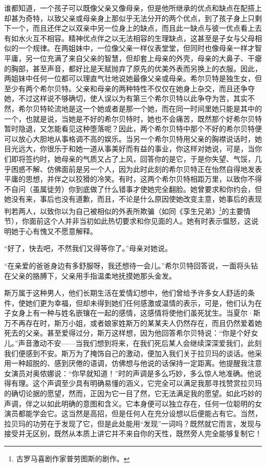 \par 谁都知道，一个孩子可以既像父亲又像母亲，但是他所继承的优点和缺点在配搭上却甚为奇特，以致父亲或母亲身上那似乎无法分开的两个优点，到了孩子身上只剩下一个，而且还伴之以双亲中另一位身上的缺点，而且此一缺点与彼一优点看上去有如水火互不相容。精神优点伴之以无法相容的生理缺点，这甚至是子女与父母相似的一个规律。在两姐妹中，一位像父亲一样仪表堂堂，但同时也像母亲一样才智平庸，另一位充满了来自父亲的智慧，但却套上母亲的外壳，母亲的大鼻子、干瘪的胸部，甚至声音，都好比是天赋抛弃了原先的优美外表而另换上的衣服。因此，两姐妹中任何一位都可以理直气壮地说她最像父亲或母亲。希尔贝特是独生女，但至少有两个希尔贝特。父亲和母亲的两种特性不仅仅在她身上杂交，而且还争夺她，不过这样说不够确切，使人误以为有第三个希尔贝特以此争夺为苦，其实不然，希尔贝特轮流地是这一个她或者是那一个她，而在同一时间里她只能是其中的一个，也就是说，当她是不好的希尔贝特时，她也不会痛苦，既然那个好希尔贝特暂时隐退，又怎能看见这种堕落呢？因此，两个希尔贝特中那个不好的希尔贝特便可以放心大胆地从事格调不高的娱乐。当另一个希尔贝特用父亲的胸襟说话时，她目光远大，你很乐于和她一道从事美好而有益的事业，你这样对她说，可是，当你们即将签约时，她母亲的气质又占了上风，回答你的是它，于是你失望、气馁，几乎困惑不解、仿佛面前是另一个人，因为此时此刻的希尔贝特正在怡然自得地发表平庸的思想，并伴之以狡猾的冷笑。有时，这两个希尔贝特相距万里，以致你不得不自问（虽属徒劳）你到底做了什么错事才使她完全翻脸。她曾要求和你约会，但她没有来，事后也没有道歉，而且，不论是什么原因使她改变主意，她事后的表现判若两人，以致你以为自己被相似的外表所欺骗（如同《孪生兄弟》\footnote{古罗马喜剧作家普劳图斯的剧作。}的主要情节），你面前这个人并非当初如此热切要求和你见面的人。她有时表示愠怒，这说明她于心有愧又不愿意解释。
\par “好了，快去吧，不然我们又得等你了。”母亲对她说。
\par “在亲爱的爸爸身边有多舒服呀，我还想待一会儿。”希尔贝特回答说，一面将头钻在父亲的胳膊下，父亲用手指温柔地抚摸她那头金发。
\par 斯万属于这种男人，他们长期生活在爱情幻想中，他们曾给予许多女人舒适的条件，使她们更为幸福，但却未得到她们任何感激或温情的表示，可是，他们认为在子女身上有一种与姓名嵌镶在一起的感情，这感情将使他们虽死犹生。当夏尔·斯万不再存在时，斯万小姐，或者娘家姓斯万的某某夫人仍然存在，而且仍然爱着她死去的父亲。甚至爱得过分，斯万这样想，因为他回答希尔贝特说：“你是个好女儿。”声音激动不安——当我们想到将来，在我们死后某人会继续深深爱我们，此刻我们便感到不安。斯万为了掩饰自己的激动，便加入我们关于拉贝玛的谈话。他采用一种超脱的、感到厌倦的语调，仿佛想与他说的话保持一定距离。他提醒我注意女演员对奥侬娜说：“你早就知道！”时的声调是多么巧妙，多么惊人地准确。他说得有理。这个声调至少具有明确易懂的涵义，它完全可以满足我那寻找赞赏拉贝玛的确切论据的愿望，然而，正因为它一目了然，它无法满足我的愿望。如此巧妙的声调，伴之以如此明确的意图和含义。它本身便可以独立存在，任何一位聪明的女演员都能学会它。这当然是高招，但是任何人在充分设想以后便能占有它。当然，拉贝玛的功劳在于发现了它，但是此处能用“发现”一词吗？既然就它而言，发现与接受并无区别，既然从本质上讲它并不来自你的天性，既然旁人完全能够复制它！

